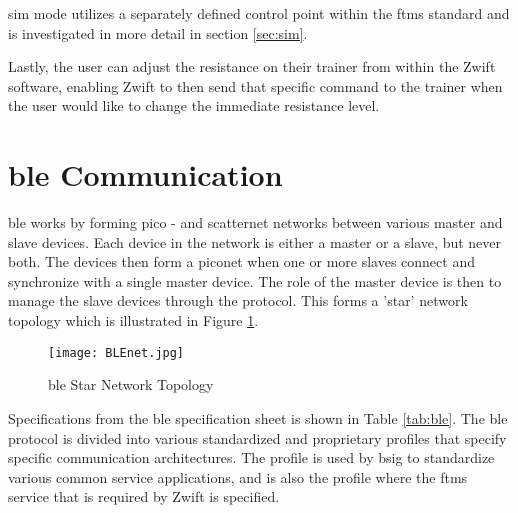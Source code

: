 \ac{sim} mode utilizes a separately defined control point within the \ac{ftms} standard and is investigated in more detail in section \ref{sec:sim}.

Lastly, the user can adjust the resistance on their trainer from within the Zwift software, enabling Zwift to then send that specific command to the trainer when the user would like to change the immediate resistance level.

\section{\ac{ble} Communication}
\label{sec:ble}

\ac{ble} works by forming pico - and scatternet networks between various master and slave devices. Each device in the network is either a master or a slave, but never both. The devices then form a piconet when one or more slaves connect and synchronize with a single master device. The role of the master device is then to manage the slave devices through the protocol. This forms a 'star' network topology which is illustrated in Figure \ref{fig:ble}. \citep{Townsend:2014}

\begin{figure}[H]
	\begin{center}
		\texttt{[image: BLEnet.jpg]}
		\caption{\ac{ble} Star Network Topology}
		\label{fig:ble}
	\end{center}
\end{figure}

Specifications from the \ac{ble} specification sheet is shown in Table \ref{tab:ble}. The \ac{ble} protocol is divided into various standardized and proprietary profiles that specify specific communication architectures. The  profile is used by \ac{bsig} to standardize various common service applications, and is also the profile where the \ac{ftms} service that is required by Zwift is specified.

